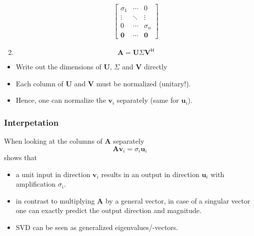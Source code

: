 \begin{enumerate}
\begin{align*}
              \begin{bmatrix}
                  \sigma_1   & \cdots & 0          \\
                  \vdots     & \ddots & \vdots     \\
                  0          & \cdots & \sigma_{n} \\
                  \mathbf{0} & \cdots & \mathbf{0}
              \end{bmatrix}
          \end{align*}
    \item \noindent\begin{equation*}
              \mathbf{A}=\mathbf{U}\Sigma \mathbf{V}^{\mathsf{H}}
          \end{equation*}
\end{enumerate}


\begin{itemize}
    \item Write out the dimensions of $\mathbf{U}$, $\Sigma$ and $\mathbf{V}$ directly
    \item Each column of $\mathbf{U}$ and $\mathbf{V}$ must be normalized (unitary!).
    \item Hence, one can normalize the $\mathbf{v}_i$ separately (same for $\mathbf{u}_i$).
\end{itemize}

\subsubsection{Interpetation}
When looking at the columns of $\mathbf{A}$ separately
\noindent\begin{equation*}
    \mathbf{Av}_i=\sigma_i \mathbf{u}_i
\end{equation*}
shows that
\begin{itemize}
    \item a unit input in direction $\mathbf{v}_i$ results in an output in direction $\mathbf{u}_i$ with amplification $\sigma_i$.
    \item in contrast to multiplying $\mathbf{A}$ by a general vector, in case of a singular vector one can exactly predict the output direction and magnitude.
    \item SVD can be seen as generalized eigenvalues/-vectors.
\end{itemize}

\newpar{}

